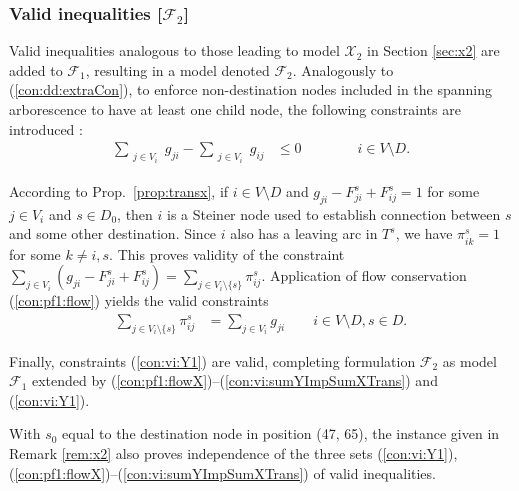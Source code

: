 \subsubsection{Valid inequalities [$\mathcal{F}_2$]}

Valid inequalities analogous to those leading to model $\mathcal{X}_2$ in Section \ref{sec:x2} are added to $\mathcal{F}_1$, resulting in a model denoted $\mathcal{F}_2$.
Analogously to (\ref{con:dd:extraCon}), to enforce non-destination nodes included in the spanning arborescence to have at least one child node,
the following constraints are introduced \citep{Polzin}:
\begin{subequations}[resume]
\begin{flalign}
\label{con:pf1:flowX}  \sum\limits_{\substack{ j\in V_i }}g_{ji}-\sum\limits_{\substack{j\in V_i}}g_{ij}    & \leq 0    \qquad\qquad i\in V\setminus D.
\end{flalign}
\end{subequations}

According to Prop.\ \ref{prop:transx}, if $i\in V\setminus D$ and $g_{ji} - F^s_{ji}+F^s_{ij}=1$ for some $j\in V_i$ and $s\in D_0$,
then $i$ is a Steiner node used to establish connection between $s$ and some other destination.
Since $i$ also has a leaving arc in $T^s$, we have $\pi_{ik}^s=1$ for some $k\neq i,s$.
This proves validity of the constraint $\sum_{j\in V_i}\left(g_{ji} - F^s_{ji}+F^s_{ij}\right)=\sum_{j\in V_i\setminus\{s\}}\pi_{ij}^s$.
Application of flow conservation (\ref{con:pf1:flow}) yields the valid constraints
\begin{subequations}[resume]
\begin{flalign}
\label{con:vi:sumYImpSumXTrans} \sum\limits_{j\in V_i\setminus\{s\}}\pi^{s}_{ij} & = \sum\limits_{j\in V_i}  g_{ji}  \quad\quad   i\in V\setminus D, s\in D. 
\end{flalign}
\end{subequations}

\noindent
Finally, constraints (\ref{con:vi:Y1}) are valid,
completing formulation $\mathcal{F}_2$ as model $\mathcal{F}_1$ extended by (\ref{con:pf1:flowX})--(\ref{con:vi:sumYImpSumXTrans}) and (\ref{con:vi:Y1}).
%
\begin{remark} \label{rem:f2}
With $s_0$ equal to the destination node in position (47, 65), the instance given in Remark \ref{rem:x2} also proves independence of the three sets
(\ref{con:vi:Y1}), (\ref{con:pf1:flowX})--(\ref{con:vi:sumYImpSumXTrans}) of valid inequalities.
\end{remark}
